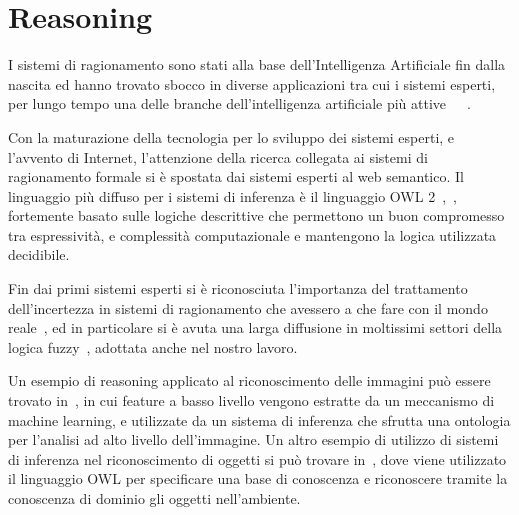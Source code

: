 \section{Reasoning}

I sistemi di ragionamento sono stati alla base dell'Intelligenza Artificiale fin dalla nascita ed hanno trovato sbocco in diverse applicazioni tra cui i sistemi esperti, per lungo tempo una delle branche dell'intelligenza artificiale più attive~\cite{buchanan1984rule}~\cite{davis1977production}~\cite{joseph1994riley}.

Con la maturazione della tecnologia per lo sviluppo dei sistemi esperti, e l'avvento di Internet, l'attenzione della ricerca collegata ai sistemi di ragionamento formale si è spostata dai sistemi esperti al web semantico.
Il linguaggio più diffuso per i sistemi di inferenza è il linguaggio OWL 2~\cite{owl2-overview},~\cite{owl2-primer}, fortemente basato sulle logiche descrittive che permettono un buon compromesso tra espressività, e complessità computazionale e mantengono la logica utilizzata decidibile.

Fin dai primi sistemi esperti si è riconosciuta l'importanza del trattamento dell'incertezza in sistemi di ragionamento che avessero a che fare con il mondo reale~\cite{davis1977production}, ed in particolare si è avuta una larga diffusione  in moltissimi settori della logica fuzzy~\cite{Zadeh1965338}, adottata anche nel nostro lavoro.

Un esempio di reasoning applicato al riconoscimento delle immagini può essere trovato in~\cite{DBLP:journals/ivc/MaillotT08}, in cui feature a basso livello vengono estratte da un meccanismo di machine learning, e utilizzate da un sistema di inferenza che sfrutta una ontologia per l'analisi ad alto livello dell'immagine. Un altro esempio di utilizzo di sistemi di inferenza nel riconoscimento di oggetti si può trovare in~\cite{DBLP:journals/corr/abs-1301-4991}, dove viene utilizzato il linguaggio OWL per specificare una base di conoscenza e riconoscere tramite la conoscenza di dominio gli oggetti nell'ambiente.

